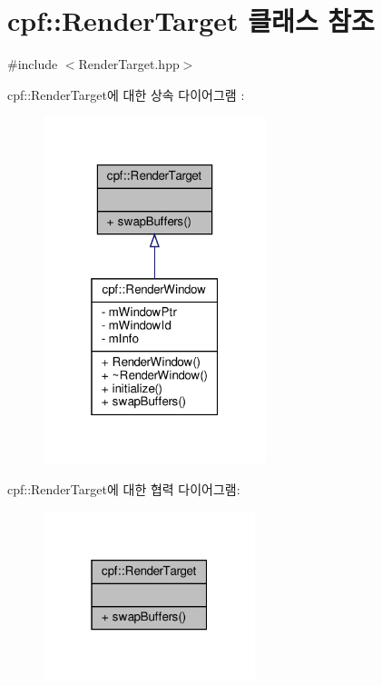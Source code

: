 \hypertarget{classcpf_1_1_render_target}{}\section{cpf\+:\+:Render\+Target 클래스 참조}
\label{classcpf_1_1_render_target}


{\ttfamily \#include $<$Render\+Target.\+hpp$>$}



cpf\+:\+:Render\+Target에 대한 상속 다이어그램 \+: 
\nopagebreak
\begin{figure}[H]
\begin{center}
\leavevmode
\includegraphics[width=184pt]{classcpf_1_1_render_target__inherit__graph}
\end{center}
\end{figure}


cpf\+:\+:Render\+Target에 대한 협력 다이어그램\+:
\nopagebreak
\begin{figure}[H]
\begin{center}
\leavevmode
\includegraphics[width=175pt]{classcpf_1_1_render_target__coll__graph}
\end{center}
\end{figure}
